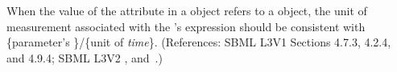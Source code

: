 When the value of the attribute  in a \RateRule object
refers to a \Parameter object, the unit of measurement associated with
the \RateRule's  expression should be consistent with
\{parameter's \}/\{unit of \emph{time}\}. (References: SBML L3V1 Sections 4.7.3, 4.2.4, and 4.9.4; SBML
L3V2 , 
and~.)
